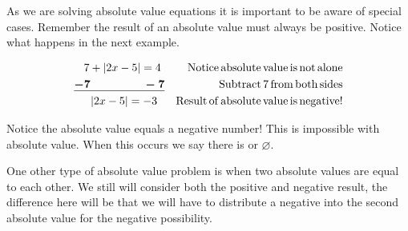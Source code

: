  As we are solving absolute value equations it is important to be aware of
special cases. Remember the result of an absolute value must always be
positive. Notice what happens in the next example.

\begin{example}\label{Lin40}
  \begin{eqnarray*}
    7 + |2x - 5| = 4~ &  & \operatorname{Notice} \operatorname{absolute} \operatorname{value} \operatorname{is}
    \operatorname{not} \operatorname{alone}\\
    \underline{\boldsymbol{- 7 ~~~~~~~~~~~~~~- 7}} &  & \operatorname{Subtract} 7 \operatorname{from}
    \operatorname{both} \operatorname{sides}\\
    |2x - 5| = - 3~~ &  & \operatorname{Result} \operatorname{of} \operatorname{absolute} \operatorname{value}
    \operatorname{is} \operatorname{negative} !
  \end{eqnarray*}
\end{example}
   Notice the absolute value equals a negative number! This is impossible with
  absolute value. When this occurs we say there is {} or
  $\varnothing$.\pp

 One other type of absolute value problem is when two absolute values are equal
to each other. We still will consider both the positive and negative result,
the difference here will be that we will have to distribute a negative into
the second absolute value for the negative possibility.

